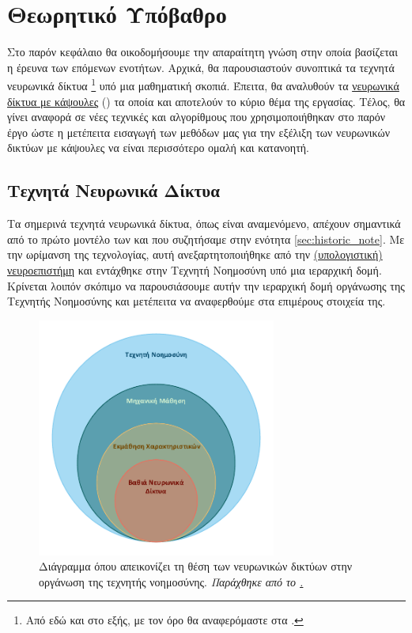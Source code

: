 \chapter{Θεωρητικό Υπόβαθρο}

Στο παρόν κεφάλαιο θα οικοδομήσουμε την απαραίτητη γνώση στην οποία βασίζεται η έρευνα των επόμενων ενοτήτων. Αρχικά, θα παρουσιαστούν συνοπτικά τα τεχνητά νευρωνικά δίκτυα \footnote{Από εδώ και στο εξής, με τον όρο  θα αναφερόμαστε στα .} υπό μια μαθηματική σκοπιά. Έπειτα, θα αναλυθούν τα \hyperlink{_capsule_networks}{νευρωνικά δίκτυα με κάψουλες} (\hyperlink{_capsule_networks}{}) τα οποία και αποτελούν το κύριο θέμα της εργασίας. Τέλος, θα γίνει αναφορά σε νέες τεχνικές και αλγορίθμους που χρησιμοποιήθηκαν στο παρόν έργο ώστε η μετέπειτα εισαγωγή των μεθόδων μας για την εξέλιξη των νευρωνικών δικτύων με κάψουλες να είναι περισσότερο ομαλή και κατανοητή.

\section{Τεχνητά Νευρωνικά Δίκτυα}
\label{sec:_artificial_NN}
Τα σημερινά τεχνητά νευρωνικά δίκτυα, όπως είναι αναμενόμενο, απέχουν σημαντικά από το πρώτο μοντέλο των  και  \cite{mcculloch1943logical} που συζητήσαμε στην ενότητα \ref{sec:historic_note}. Με την ωρίμανση της τεχνολογίας, αυτή ανεξαρτητοποιήθηκε από την \hyperlink{_computational_neuroscience}{(υπολογιστική) νευροεπιστήμη} και εντάχθηκε στην Τεχνητή Νοημοσύνη υπό μια ιεραρχική δομή. Κρίνεται λοιπόν σκόπιμο να παρουσιάσουμε αυτήν την ιεραρχική δομή οργάνωσης της Τεχνητής Νοημοσύνης και μετέπειτα να αναφερθούμε στα επιμέρους στοιχεία της.
\par

\begin{figure}[h]
    \centering
    \includegraphics[width=0.7\textwidth]{images/chapter theoritical background/venn ai diagram thesis in greek new 2.pdf}
    \caption{Διάγραμμα  όπου απεικονίζει τη θέση των νευρωνικών δικτύων στην οργάνωση της τεχνητής νοημοσύνης. \textit{Παράχθηκε από το \href{https://www.microsoft.com/en-gb/microsoft-365/visio/flowchart-software/}{.}} }
    \label{fig:_venn_ai}
\end{figure}


